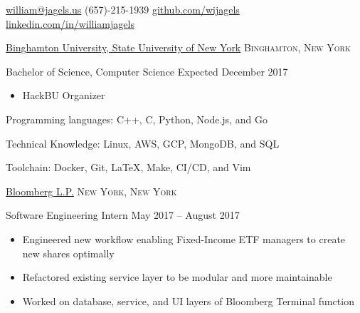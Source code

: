 \documentclass[11pt]{article}
\begin{document}


\nobreakvspace{0.3em}  %

\href{mailto:william@jagels.us}{william@jagels.us}\sbull
(657)-215-1939\sbull
\href{https://github.com/wijagels}{github.com/wijagels}\sbull
\href{https://www.linkedin.com/in/williamjagels}{linkedin.com/in/williamjagels}


\spacedhrule{0.1em}{0.9em}  %

\headedsection
{\href{http://www.binghamton.edu/index.php}{Binghamton University, State University of New York}}
{\textsc{Binghamton, New York}} {
    \headedsubsection
    {Bachelor of Science, Computer Science}
    {Expected December 2017}
    {
        \begin{itemize}
            \item HackBU Organizer
        \end{itemize}
    }
}



\spacedhrule{0.1em}{0.9em}  %

\inlineheadsection  %
{Programming languages:}
{C++, C, Python, Node.js, and Go}


\inlineheadsection
{Technical Knowledge:}
{Linux, AWS, GCP, MongoDB, and SQL}

\inlineheadsection
{Toolchain:}
{Docker, Git, \LaTeX, Make, CI/CD, and Vim}




\spacedhrule{0.1em}{0.9em}  %

\headedsection
{\href{https://www.bloomberg.com/}{Bloomberg L.P.}}
{\textsc{New York, New York}} {
  \headedsubsection
  {Software Engineering Intern}
  {May 2017 -- August 2017}
  {
    \begin{itemize}
      \item Engineered new workflow enabling Fixed-Income ETF managers to create new shares optimally
      \item Refactored existing service layer to be modular and more maintainable
      \item Worked on database, service, and UI layers of Bloomberg Terminal function
    \end{itemize}
  }
}
\end{document}
